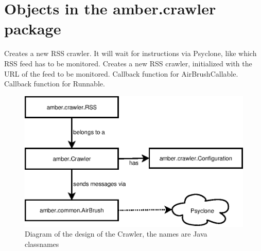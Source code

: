 \section{Objects in the amber.crawler package}




\begin{classmetadata}
\end{classmetadata}

\begin{interface}
    {Creates a new RSS crawler. It will wait for instructions via Psyclone,
      like which RSS feed has to be monitored.}
    {Creates a new RSS crawler, initialized with the URL of the feed to be
      monitored.}
    {Callback function for AirBrushCallable.}
    {Callback function for Runnable.}
\end{interface}



\begin{figure}
  \centering
  \includegraphics{image/crawler}
  \caption{
    Diagram of the design of the Crawler, the names are Java classnames
  }
\end{figure}


